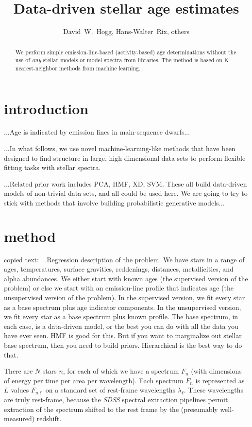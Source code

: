 \documentclass[12pt, preprint]{aastex}
\newcommand{\project}[1]{\textsl{#1}}
\begin{document}
\title{Data-driven stellar age estimates}
\author{
  David~W.~Hogg,
  Hans-Walter~Rix, others
}

\begin{abstract}
We perform simple emission-line-based (activity-based) age
determinations without the use of \emph{any} stellar models or model
spectra from libraries.  The method is based on K-nearest-neighbor
methods from machine learning.
\end{abstract}

\section{introduction}

...Age is indicated by emission lines in main-sequence dwarfs...

...In what follows, we use novel machine-learning-like methods that
have been designed to find structure in large, high dimensional data
sets to perform flexible fitting tasks with stellar spectra.

...Related prior work includes PCA, HMF, XD, SVM.  These all build
data-driven models of non-trivial data sets, and all could be used
here.  We are going to try to stick with methods that involve building
probabilistic generative models...

\section{method}

copied text: ...Regression description of the problem.  We have stars
in a range of ages, temperatures, surface gravities, reddenings,
distances, metallicities, and alpha abundances.  We either start with
known ages (the supervised version of the problem) or else we start
with an emission-line profile that indicates age (the unsupervised
version of the problem).  In the supervised version, we fit every star
as a base spectrum plus age indicator components.  In the unsupervised
version, we fit every star as a base spectrum plus known profile.  The
base spectrum, in each case, is a data-driven model, or the best you
can do with all the data you have ever seen.  HMF is good for this.
But if you want to marginalize out stellar base spectrum, then you
need to build priors.  Hierarchical is the best way to do that.

There are $N$ stars $n$, for each of which we have a spectrum $F_n$
(with dimensions of energy per time per area per wavelength).  Each
spectrum $F_n$ is represented as $L$ values $F_{n\ell}$ on a standard set
of rest-frame wavelengths $\lambda_\ell$.  These wavelengths are truly
rest-frame, because the \project{SDSS} spectral extraction pipelines
permit extraction of the spectrum shifted to the rest frame by the
(presumably well-measured) redshift.
\end{document}
